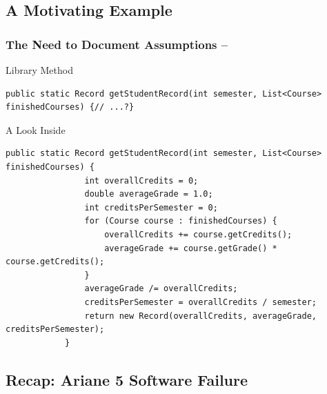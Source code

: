 \subsection{A Motivating Example}

\begin{frame}[fragile]
	\frametitle{The Need to Document Assumptions -- \insertsubsection{}}
	\begin{example}{Library Method}
		\begin{lstlisting}[style=java]
public static Record getStudentRecord(int semester, List<Course> finishedCourses) {// ...?}
		\end{lstlisting}
	\end{example}
	\pause
		\begin{example}{A Look Inside}
			\begin{lstlisting}[style=java,basicstyle=\small]
			public static Record getStudentRecord(int semester, List<Course> finishedCourses) {
				int overallCredits = 0;
				double averageGrade = 1.0;
				int creditsPerSemester = 0;
				for (Course course : finishedCourses) {
					overallCredits += course.getCredits();
					averageGrade += course.getGrade() * course.getCredits();
				}
				averageGrade /= overallCredits;
				creditsPerSemester = overallCredits / semester;
				return new Record(overallCredits, averageGrade, creditsPerSemester);
			}
			\end{lstlisting}
		\end{example}
\end{frame}

\subsection{Recap: Ariane 5 Software Failure}
\begin{frame}{\insertsubsection}
	\slideArianeFailure
\end{frame}

